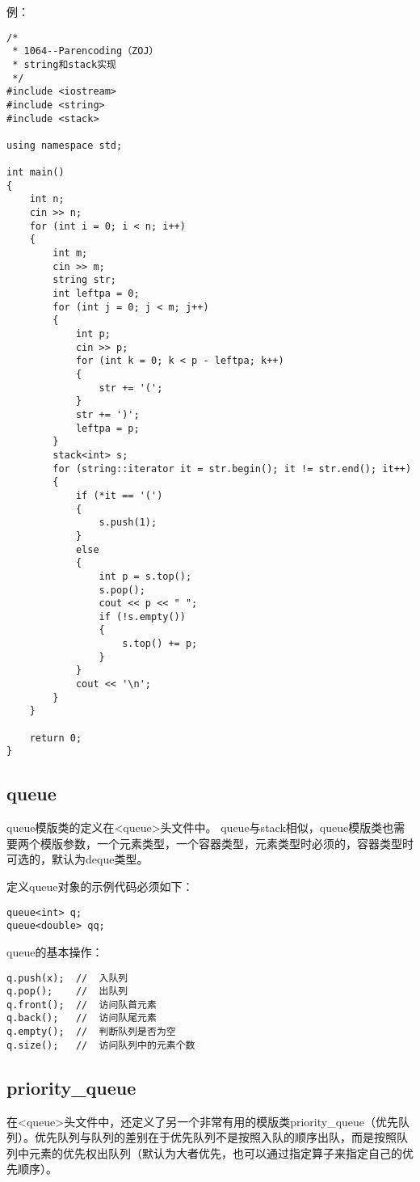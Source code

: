 例：
\begin{lstlisting}
/*
 * 1064--Parencoding（ZOJ）
 * string和stack实现
 */
#include <iostream>
#include <string>
#include <stack>

using namespace std;

int main()
{
    int n;
    cin >> n;
    for (int i = 0; i < n; i++)
    {
        int m;
        cin >> m;
        string str;
        int leftpa = 0;
        for (int j = 0; j < m; j++)
        {
            int p;
            cin >> p;
            for (int k = 0; k < p - leftpa; k++)
            {
                str += '(';
            }
            str += ')';
            leftpa = p;
        }
        stack<int> s;
        for (string::iterator it = str.begin(); it != str.end(); it++)
        {
            if (*it == '(')
            {
                s.push(1);
            }
            else
            {
                int p = s.top();
                s.pop();
                cout << p << " ";
                if (!s.empty())
                {
                    s.top() += p;
                }
            }
            cout << '\n';
        }
    }

    return 0;
}
\end{lstlisting}


\subsection{queue}
queue模版类的定义在<queue>头文件中。 
queue与stack相似，queue模版类也需要两个模版参数，一个元素类型，一个容器类型，元素类型时必须的，容器类型时可选的，默认为deque类型。

定义queue对象的示例代码必须如下：
\begin{lstlisting}
queue<int> q;
queue<double> qq;
\end{lstlisting}

queue的基本操作：
\begin{lstlisting}
q.push(x);  //  入队列
q.pop();    //  出队列
q.front();  //  访问队首元素
q.back();   //  访问队尾元素
q.empty();  //  判断队列是否为空
q.size();   //  访问队列中的元素个数
\end{lstlisting}


\subsection{priority\_queue}
在<queue>头文件中，还定义了另一个非常有用的模版类priority\_queue（优先队列）。优先队列与队列的差别在于优先队列不是按照入队的顺序出队，而是按照队列中元素的优先权出队列（默认为大者优先，也可以通过指定算子来指定自己的优先顺序）。

